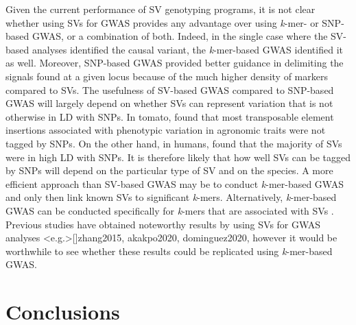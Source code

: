 \documentclass{article}
\begin{document}
Given the current performance of SV genotyping programs, it is not clear
whether using SVs for GWAS provides any advantage over using \emph{k}-mer- or
SNP-based GWAS, or a combination of both.  Indeed, in the single case where the
SV-based analyses identified the causal variant, the \emph{k}-mer-based GWAS
identified it as well. Moreover, SNP-based GWAS provided better guidance
in delimiting the signals found at a given locus because of the much higher
density of markers compared to SVs.  The usefulness of SV-based GWAS compared
to SNP-based GWAS will largely depend on whether SVs can represent variation
that is not otherwise in LD with SNPs. In tomato,  found
that most transposable element insertions associated with phenotypic variation
in agronomic traits were not tagged by SNPs. On the other hand, in humans,
 found that the majority of SVs were in high LD with SNPs. It
is therefore likely that how well SVs can be tagged by SNPs will depend on the
particular type of SV and on the species. A more efficient approach than
SV-based GWAS may be to conduct \emph{k}-mer-based GWAS and only then link
known SVs to significant \emph{k}-mers.  Alternatively, \textit{k}-mer-based
GWAS can be conducted specifically for \textit{k}-mers that are associated with
SVs .  Previous studies have obtained noteworthy results by
using SVs for GWAS analyses \shortcite<e.g.>[]{zhang2015, akakpo2020,
dominguez2020}, however it would be worthwhile to see whether these results
could be replicated using \emph{k}-mer-based GWAS.

\clearpage

\section*{Conclusions}
\end{document}
